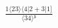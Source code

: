 \documentclass[varwidth, border=5pt]{standalone}
\begin{document}
\begin{my}
$\begin{gathered}
\scriptscriptstyle\frac{1⟨23⟩⟨4|2+3|1]}{⟨34⟩³}
\end{gathered}$
\end{my}
\end{document}
